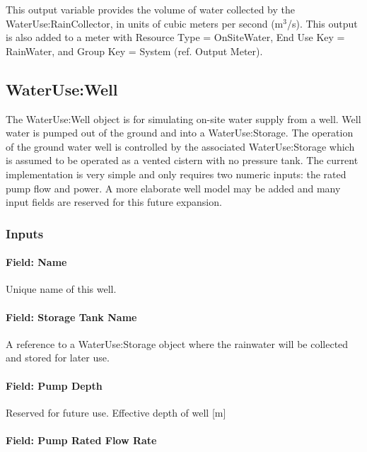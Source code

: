 This output variable provides the volume of water collected by the WaterUse:RainCollector, in units of cubic meters per second (m\(^{3}\)/s). This output is also added to a meter with Resource Type = OnSiteWater, End Use Key = RainWater, and Group Key = System (ref. Output Meter).

\subsection{WaterUse:Well}\label{waterusewell}

The WaterUse:Well object is for simulating on-site water supply from a well. Well water is pumped out of the ground and into a WaterUse:Storage. The operation of the ground water well is controlled by the associated WaterUse:Storage which is assumed to be operated as a vented cistern with no pressure tank. The current implementation is very simple and only requires two numeric inputs: the rated pump flow and power. A more elaborate well model may be added and many input fields are reserved for this future expansion.

\subsubsection{Inputs}\label{inputs-4-038}

\paragraph{Field: Name}\label{field-name-4-033}

Unique name of this well.

\paragraph{Field: Storage Tank Name}\label{field-storage-tank-name-1}

A reference to a WaterUse:Storage object where the rainwater will be collected and stored for later use.

\paragraph{Field: Pump Depth}\label{field-pump-depth}

Reserved for future use. Effective depth of well {[}m{]}

\paragraph{Field: Pump Rated Flow Rate}\label{field-pump-rated-flow-rate}

